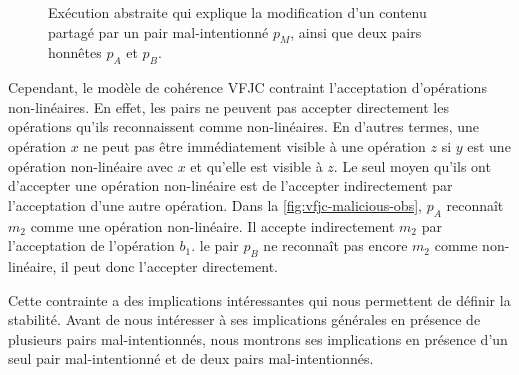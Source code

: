 \begin{figure}[htb]
\centering
{}
\caption[Opérations non-linéaires]{Exécution abstraite qui explique la modification d'un contenu partagé par un pair mal-intentionné $p_M$, ainsi que deux pairs honnêtes $p_A$ et $p_B$.}\label{fig:vfjc-malicious-obs}
\end{figure}

Cependant, le modèle de cohérence \acl{VFJC} contraint l'acceptation d'opérations non-linéaires.
En effet, les pairs ne peuvent pas accepter directement les opérations qu'ils reconnaissent comme non-linéaires.
En d'autres termes, une opération $x$ ne peut pas être immédiatement visible à une opération $z$ si $y$ est une opération non-linéaire avec $x$ et qu'elle est visible à $z$.
Le seul moyen qu'ils ont d'accepter une opération non-linéaire est de l'accepter indirectement par l'acceptation d'une autre opération.
Dans la \autoref{fig:vfjc-malicious-obs}, $p_A$ reconnaît $m_2$ comme une opération non-linéaire.
Il accepte indirectement $m_2$ par l'acceptation de l'opération $b_1$.
le pair $p_B$ ne reconnaît pas encore $m_2$ comme non-linéaire, il peut donc l'accepter directement.

Cette contrainte a des implications intéressantes qui nous permettent de définir la stabilité.
Avant de nous intéresser à ses implications générales en présence de plusieurs pairs mal-intentionnés, nous montrons ses implications en présence d'un seul pair mal-intentionné et de deux pairs mal-intentionnés.

